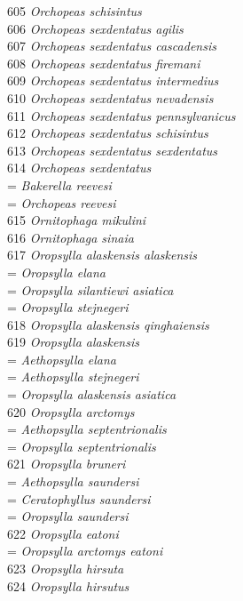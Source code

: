 \documentclass[
]{article}
\begin{document}
605 \emph{Orchopeas schisintus}\\
606 \emph{Orchopeas sexdentatus agilis}\\
607 \emph{Orchopeas sexdentatus cascadensis}\\
608 \emph{Orchopeas sexdentatus firemani}\\
609 \emph{Orchopeas sexdentatus intermedius}\\
610 \emph{Orchopeas sexdentatus nevadensis}\\
611 \emph{Orchopeas sexdentatus pennsylvanicus}\\
612 \emph{Orchopeas sexdentatus schisintus}\\
613 \emph{Orchopeas sexdentatus sexdentatus}\\
614 \emph{Orchopeas sexdentatus}\\
= \emph{Bakerella reevesi}\\
= \emph{Orchopeas reevesi}\\
615 \emph{Ornitophaga mikulini}\\
616 \emph{Ornitophaga sinaia}\\
617 \emph{Oropsylla alaskensis alaskensis}\\
= \emph{Oropsylla elana}\\
= \emph{Oropsylla silantiewi asiatica}\\
= \emph{Oropsylla stejnegeri}\\
618 \emph{Oropsylla alaskensis qinghaiensis}\\
619 \emph{Oropsylla alaskensis}\\
= \emph{Aethopsylla elana}\\
= \emph{Aethopsylla stejnegeri}\\
= \emph{Oropsylla alaskensis asiatica}\\
620 \emph{Oropsylla arctomys}\\
= \emph{Aethopsylla septentrionalis}\\
= \emph{Oropsylla septentrionalis}\\
621 \emph{Oropsylla bruneri}\\
= \emph{Aethopsylla saundersi}\\
= \emph{Ceratophyllus saundersi}\\
= \emph{Oropsylla saundersi}\\
622 \emph{Oropsylla eatoni}\\
= \emph{Oropsylla arctomys eatoni}\\
623 \emph{Oropsylla hirsuta}\\
624 \emph{Oropsylla hirsutus}\\
\end{document}
